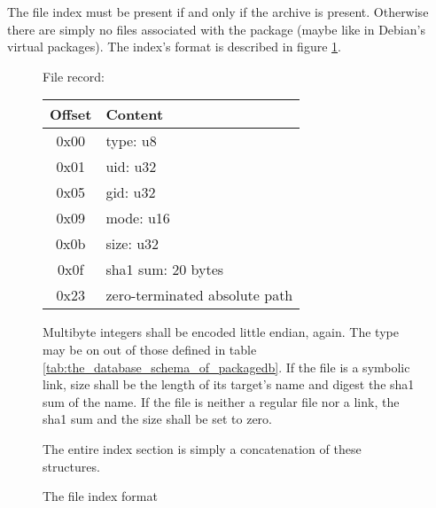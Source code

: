 \documentclass[a4paper]{scrartcl}
\begin{document}
	The file index must be present if and only if the archive is present. Otherwise there are simply no files associated with the package (maybe like in Debian's virtual packages). The index's format is described in figure \ref{fig:the_file_index_format}.
	
	\begin{figure}[ht]
		
		\begin{center}
			\begin{minipage}{.6\textwidth}
				File record:
				
				\vspace{0.5eM}
				
				\begin{tabular}{|c|l|}
					\hline
					Offset & Content \\
					\hline
					0x00 & type: u8 \\
					\hline
					0x01 & uid: u32 \\
					\hline
					0x05 & gid: u32 \\
					\hline
					0x09 & mode: u16 \\
					\hline
					0x0b & size: u32 \\
					\hline
					0x0f & sha1 sum: 20 bytes \\
					\hline
					0x23 & zero-terminated absolute path \\
					\hline
				\end{tabular}
			\end{minipage}
		\end{center}
		
		\vspace{1eM}
		
		Multibyte integers shall be encoded little endian, again. The type may be on out of those defined in table \ref{tab:the_database_schema_of_packagedb}. If the file is a symbolic link, size shall be the length of its target's name and digest the sha1 sum of the name. If the file is neither a regular file nor a link, the sha1 sum and the size shall be set to zero.
		
		\vspace{1eM}
		
		The entire index section is simply a concatenation of these structures.
		
		\caption{The file index format}
		\label{fig:the_file_index_format}
	\end{figure}
\end{document}
